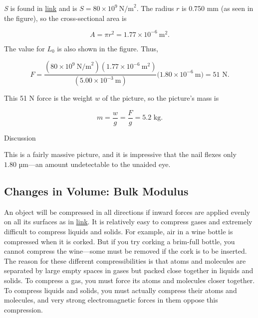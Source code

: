 \documentclass[
]{book}
\begin{document}
\emph{S} is found in
\protect\hyperlink{import-auto-id1165298671576}{link} and is
\({{S = {\text{80} \times \text{10}^{9}}}\ \text{N/m}^{2}}{}\). The radius
\(r{}\) is 0.750 mm (as seen in the figure), so the cross-sectional area
is

\leavevmode{}%
\[{{{{A = {\pi r}^{2}} = 1}\text{.}{\text{77} \times \text{10}^{- 6}}\ \text{m}^{2}}.}{}\]

The value for \(L_{0}{}\) is also shown in the figure. Thus,

\leavevmode{}%
\[{{F = {\frac{({\text{80} \times \text{10}^{9}}\ \text{N/m}^{2})(1\text{.}{\text{77} \times \text{10}^{- 6}\ }\text{m}^{2})}{(5\text{.}{\text{00} \times \text{10}^{- 3}\ }\text{m})}(}}1\text{.}{\text{80} \times \text{10}^{- 6}}\ \text{m}) = \text{51\ N.}}{}\]

This 51 N force is the weight \(w\) of the picture, so the picture's mass
is

\leavevmode{}%
\[{{{{{m = \frac{w}{g}} = \frac{F}{g}} = 5}\text{.2\ kg}}.}{}\]

{Discussion}

This is a fairly massive picture, and it is impressive that the nail
flexes only \(\text{1.80\ µm}\)---an amount undetectable to the unaided
eye.

\hypertarget{fs-id1165298483858}{}
\hypertarget{changes-in-volume-bulk-modulus}{%
\subsection{Changes in Volume: Bulk Modulus}\label{changes-in-volume-bulk-modulus}}

An object will be compressed in all directions if inward forces are
applied evenly on all its surfaces as in
\protect\hyperlink{import-auto-id1165296230954}{link}. It is
relatively easy to compress gases and extremely difficult to compress
liquids and solids. For example, air in a wine bottle is compressed when
it is corked. But if you try corking a brim-full bottle, you cannot
compress the wine---some must be removed if the cork is to be inserted.
The reason for these different compressibilities is that atoms and
molecules are separated by large empty spaces in gases but packed close
together in liquids and solids. To compress a gas, you must force its
atoms and molecules closer together. To compress liquids and solids, you
must actually compress their atoms and molecules, and very strong
electromagnetic forces in them oppose this compression.
\end{document}
